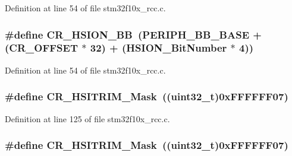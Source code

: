 Definition at line 54 of file stm32f10x\+\_\+rcc.\+c.

\subsubsection[{\texorpdfstring{C\+R\+\_\+\+H\+S\+I\+O\+N\+\_\+\+BB}{CR_HSION_BB}}]{\setlength{\rightskip}{0pt plus 5cm}\#define C\+R\+\_\+\+H\+S\+I\+O\+N\+\_\+\+BB~({\bf P\+E\+R\+I\+P\+H\+\_\+\+B\+B\+\_\+\+B\+A\+SE} + ({\bf C\+R\+\_\+\+O\+F\+F\+S\+ET} $\ast$ 32) + ({\bf H\+S\+I\+O\+N\+\_\+\+Bit\+Number} $\ast$ 4))}\hypertarget{group___r_c_c___private___defines_gac3290a833c0e35ec17d32c2d494e6133}{}\label{group___r_c_c___private___defines_gac3290a833c0e35ec17d32c2d494e6133}


Definition at line 54 of file stm32f10x\+\_\+rcc.\+c.

\subsubsection[{\texorpdfstring{C\+R\+\_\+\+H\+S\+I\+T\+R\+I\+M\+\_\+\+Mask}{CR_HSITRIM_Mask}}]{\setlength{\rightskip}{0pt plus 5cm}\#define C\+R\+\_\+\+H\+S\+I\+T\+R\+I\+M\+\_\+\+Mask~(({\bf uint32\+\_\+t})0x\+F\+F\+F\+F\+F\+F07)}\hypertarget{group___r_c_c___private___defines_gac6a6adccdfb5a34541e2cdf01daf98ce}{}\label{group___r_c_c___private___defines_gac6a6adccdfb5a34541e2cdf01daf98ce}


Definition at line 125 of file stm32f10x\+\_\+rcc.\+c.

\subsubsection[{\texorpdfstring{C\+R\+\_\+\+H\+S\+I\+T\+R\+I\+M\+\_\+\+Mask}{CR_HSITRIM_Mask}}]{\setlength{\rightskip}{0pt plus 5cm}\#define C\+R\+\_\+\+H\+S\+I\+T\+R\+I\+M\+\_\+\+Mask~(({\bf uint32\+\_\+t})0x\+F\+F\+F\+F\+F\+F07)}\hypertarget{group___r_c_c___private___defines_gac6a6adccdfb5a34541e2cdf01daf98ce}{}\label{group___r_c_c___private___defines_gac6a6adccdfb5a34541e2cdf01daf98ce}



